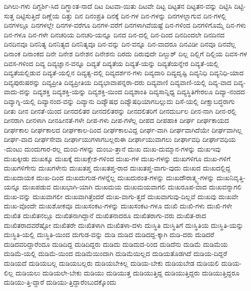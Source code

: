 {ದಿಗಿಲು-ಗಳು
ದಿಗ್ದರ್ಶಿ-ಸಿದ
ದಿಗ್ಭ್ರಾಂತ-ನಾದೆ
ದಿಟ
ದಿಟವಾ-ಯಿತು
ದಿಟವೇ
ದಿಟ್ಟ
ದಿಟ್ಟತನ
ದಿಟ್ಟತನ-ವನ್ನು
ದಿಟ್ಟಿಸಿ
ದಿಟ್ಟಿ-ಸುತ್ತ
ದಿಟ್ಟಿಸುತ್ತಿದೆ
ದಿಣ್ಣೆಯ
ದಿತ್ತು
ದಿನ
ದಿನಂಪ್ರತಿ
ದಿನಕ್ಕೆ
ದಿನ-ಗಳ
ದಿನ-ಗಳನ್ನು
ದಿನಗಳಲ್ಲಾಗುವ
ದಿನ-ಗಳಲ್ಲಿ
ದಿನಗಳಲ್ಲೂ
ದಿನಗಳಲ್ಲೇ
ದಿನಗಳ-ವರೆಗೂ
ದಿನಗಳ-ವರೆಗೆ
ದಿನಗಳಾಗಿವೆಯಷ್ಟೆ
ದಿನ-ಗಳಿಂದ
ದಿನಗಳಿಗೊಮ್ಮೆ
ದಿನ-ಗಳು
ದಿನ-ಗಳೂ
ದಿನ-ಗಳೇ
ದಿನಚರಿಯ
ದಿನಚರಿ-ಯನ್ನೂ
ದಿನದ
ದಿನ-ದಲ್ಲಿ
ದಿನ-ದಿಂದ
ದಿನದಿಂದಲೇ
ದಿನದಿನದ
ದಿನದಿನವೂ
ದಿನನಿತ್ಯ
ದಿನನಿತ್ಯದ
ದಿನನಿತ್ಯವೂ
ದಿನ-ವನ್ನು
ದಿನ-ವನ್ನೂ
ದಿನ-ವಾದರೂ
ದಿನವಿಡೀ
ದಿನವೂ
ದಿನವೆಲ್ಲ
ದಿನಾಂಕ
ದಿನಾಂಕದ
ದಿನೇ
ದಿನೇಶ
ದಿನೇಶನ
ದಿನೇಶನು
ದಿರದು
ದಿರುವುದೇ
ದಿಲ್ಖುಶ್
ದಿಲ್ಲ
ದಿಲ್ಲಿಗೆ
ದಿಲ್ಲಿಯ
ದಿವಸ-ಗಳ
ದಿವಸ-ಗಳಿಂದ
ದಿವ್ಯ
ದಿವ್ಯಜ್ಞಾನ-ವನ್ನೂ
ದಿವ್ಯತೆ
ದಿವ್ಯತೆಯ
ದಿವ್ಯತೆ-ಯನ್ನು
ದಿವ್ಯತೆಯನ್ನೇರ
ದಿವ್ಯತೆ-ಯಲ್ಲಿ
ದಿವ್ಯತೆಯಲ್ಲಿಡುವ
ದಿವ್ಯತೆ-ಯಲ್ಲಿನ
ದಿವ್ಯತ್ವ-ದಲ್ಲಿ
ದಿವ್ಯದರ್ಶನ-ಗಳು
ದಿವ್ಯದಾರಿ
ದಿವ್ಯದೃಷ್ಟಿ
ದಿವ್ಯನಿಧಿ
ದಿವ್ಯನಿಧಿ-ಯಾದ
ದಿವ್ಯಪುರುಷರನ್ನು
ದಿವ್ಯಪ್ರೀತಿ
ದಿವ್ಯಪ್ರೀತಿಯ
ದಿವ್ಯಭಾವಾಪನ್ನರಾ-ದರು
ದಿವ್ಯವಾಣಿ
ದಿವ್ಯವಾಣಿ-ಯಲ್ಲಿ
ದಿವ್ಯ-ವಾದ
ದಿವ್ಯ-ವಾದು-ದನ್ನು
ದಿವ್ಯಶಕ್ತಿ
ದಿವ್ಯಶಕ್ತಿ-ಯನ್ನು
ದಿವ್ಯಶಕ್ತಿ-ಯಿಂದ
ದಿವ್ಯಶಾಂತಿ
ದಿವ್ಯಸಾನ್ನಿಧ್ಯ
ದಿವ್ಯಸ್ಥಿತಿಗೇರಲೂ
ದಿವ್ಯಾ-ನಂದದ
ದಿವ್ಯಾಗ್ನಿ-ಯಲ್ಲಿ
ದಿವ್ಯಾನಂದ-ವನ್ನು
ದಿವ್ಯಾನು
ದಿವ್ಯೌಷಧ
ದಿವ್ಯೌಷಧಿಯಾಗಬಲ್ಲುದು
ದಿಸೆ-ಯಲ್ಲಿ
ದೀಕ್ಷಾಬದ್ಧರಾಗು
ದೀತು
ದೀನ
ದೀನತೆ-ಯಿಂದ
ದೀನದಲಿತರ
ದೀನದಲಿತರನ್ನು
ದೀನದಲಿತರಿಗೆ
ದೀನದುರ್ಬಲ
ದೀನ-ನಾಗಿ
ದೀನ-ರಲ್ಲಿ
ದೀನರಾಗಿ
ದೀನಳಾಗಿ
ದೀನಹೀನತೆ-ಗಳೇ
ದೀಪ-ಗಳು
ದೀಪ-ಗಳೆಲ್ಲ
ದೀಪದ
ದೀಪಹಾಕಿ
ದೀರ್ಘ
ದೀರ್ಘಕಾಯದ
ದೀರ್ಘಕಾಲ
ದೀರ್ಘಕಾಲದ
ದೀರ್ಘಕಾಲ-ದಿಂದ
ದೀರ್ಘಕಾಲವಿದ್ದ
ದೀರ್ಘ-ವಾಗಿ
ದೀರ್ಘವಾಗಿದೆಯೇ
ದೀರ್ಘವಾಗಿಲ್ಲ
ದೀರ್ಘ-ವಾದ
ದೀರ್ಘಸೇವಾ
ದೀರ್ಘಾಯುಗಳಾಗಬಲ್ಲರುಈ
ದೀರ್ಘಾಯುವಾಗಲು
ದೀರ್ಘಾವಧಿ
ದೀರ್ಘಾವಧಿಯ
-ದುಂಟು
ದುಂದುಗಾರ-ರಲ್ಲ
ದುಂಬಿ-ಗಳನ್ನು
ದುಂಬು-ತ್ತಾನೆ
ದುಃಖ
ದುಃಖ-ದುಮ್ಮಾನ-ಗಳನ್ನು
ದುಃಖಇವು
ದುಃಖಕ್ಕೀಡು
ದುಃಖಕ್ಕೂ
ದುಃಖಕ್ಕೆ
ದುಃಖಕ್ಲೇಶ-ಗಳಿಂದ
ದುಃಖ-ಗಳ
ದುಃಖ-ಗಳನ್ನು
ದುಃಖಗಳಿಗೂ
ದುಃಖ-ಗಳಿಗೆ
ದುಃಖಗಳಿಗೇನು
ದುಃಖಗಳೇನು
ದುಃಖತಪ್ತ
ದುಃಖತಪ್ತ-ರಾದ
ದುಃಖತಪ್ತ-ವಾಗು-ವುದು
ದುಃಖದ
ದುಃಖದಲ್ಲಿದ್ದ
ದುಃಖದಾಯಕ
ದುಃಖ-ದಿಂದ
ದುಃಖದುಗುಡ-ಗಳನ್ನೆಲ್ಲ
ದುಃಖದುರಂತ-ಗಳನ್ನು
ದುಃಖದೌರಾತ್ಮ್ಯ-ಗಳನ್ನು
ದುಃಖನಿವೃತ್ತಿ-ಯನ್ನೂ
ದುಃಖಪಡುವ
ದುಃಖಭಾಗಿ-ಯಾಗಿ
ದುಃಖಮಯ
ದುಃಖಮಯವಾಗಲಿ
ದುಃಖರೂಪ-ವಾದ
ದುಃಖವನ್ನಾಗಲಿ
ದುಃಖ-ವನ್ನು
ದುಃಖವಾಗಲೀ
ದುಃಖವಾಗಿತ್ತೆಂದರೆ
ದುಃಖ-ವಾಗು-ತ್ತದೆ
ದುಃಖವಾಗುವು-ದಿಲ್ಲವೆ
ದುಃಖವು
ದುಃಖವೇ
ದುಃಖ-ವೊಂದೇ
ದುಃಖಶೋಕವೂ
ದುಃಖಸಂಕಟ-ಗಳನ್ನು
ದುಃಖಸಂಕಟ-ಗಳೂ
ದುಃಖಿ
ದುಃಖಿ-ಗಳು
ದುಃಖಿ-ಗಳೇ
ದುಃಖಿತ
ದುಃಖಿತನಲ್ಲೂ
ದುಃಖಿತನಾಗಿದ್ದಾನೆ
ದುಃಖಿತನಾದರೂ
ದುಃಖಿತರಾಗು-ವರು
ದುಃಖಿತ-ರಾದ
ದುಃಖಿತರಾದವರೆಷ್ಟೋ
ದುಃಖಿತರೇ
ದುಃಖಿತಳಾಗಿ
ದುಃಖಿತಳಾ-ದಳು
ದುಃಸ್ಥಿತಿ
ದುಃಸ್ಥಿತಿಗೆ
ದುಃಸ್ಥಿತಿಯ
ದುಃಸ್ಥಿತಿ-ಯನ್ನು
ದುಃಸ್ಥಿತಿ-ಯಲ್ಲಿ
ದುಃಸ್ಥಿತಿ-ಯಿಂದ
ದುಗುಡ-ವನ್ನು
ದುಡಿ
ದುಡಿದ
ದುಡಿದದ್ದ-ಕ್ಕಾಗಿ
ದುಡಿ-ದರು
ದುಡಿದರೆ
ದುಡಿದವರಿದ್ದಾರೆಂದೂ
ದುಡಿದಿದ್ದ
ದುಡಿದಿದ್ದರು
ದುಡಿದು
ದುಡಿದುದ-ರಿಂದ
ದುಡಿದೆನು
ದುಡಿಮೆ
ದುಡಿಮೆಯ
ದುಡಿಮೆ-ಯಲ್ಲಿ
ದುಡಿಮೆ-ಯಿಂದ
ದುಡಿಮೆಯಿಂದಾಗಿ
ದುಡಿಮೆಯಿಲ್ಲದ
ದುಡಿಯತೊಡಗಿದೆ
ದುಡಿಯ-ದಿದ್ದರೆ
ದುಡಿಯದೆ
ದುಡಿಯಬಲ್ಲ
ದುಡಿಯಬಲ್ಲರು
ದುಡಿಯಬೇಕಿಲ್ಲ
ದುಡಿಯ-ಬೇಕು
ದುಡಿಯಬೇಡ
ದುಡಿಯಲಿ
ದುಡಿಯ-ಲಿಲ್ಲ
ದುಡಿಯಲು
ದುಡಿಯಲೇ-ಬೇಕು
ದುಡಿಯು
ದುಡಿಯುತ್ತ
ದುಡಿಯುತ್ತಿದ್ದ
ದುಡಿಯುತ್ತಿದ್ದರು
ದುಡಿಯುತ್ತಿದ್ದರೂ
ದುಡಿಯು-ತ್ತಿ-ದ್ದಾರೆ
ದುಡಿಯು-ತ್ತಿದ್ದಾರೆಂಬುದಕ್ಕೊಂದು
}
